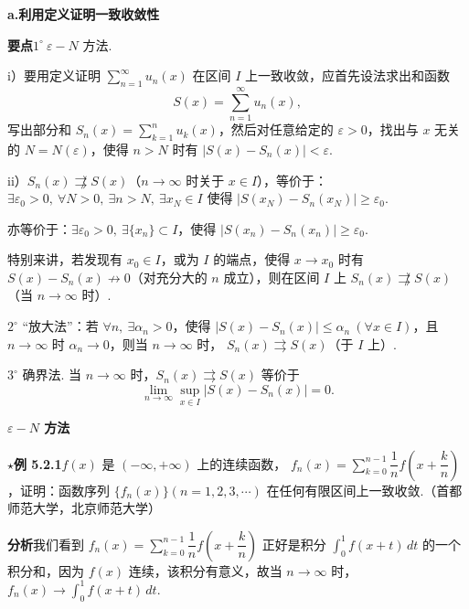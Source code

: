 \documentclass[UTF8, 12pt, fontset=fandol, oneside]{ctexart}
\begin{document}
\noindent\textbf{a.\quad 利用定义证明一致收敛性}

\noindent\textbf{要点}\quad $1^\circ\ \varepsilon-N$ 方法.

i）要用定义证明 $\displaystyle\sum_{n=1}^{\infty}u_n(x)$ 在区间 $I$ 上一致收敛，应首先设法求出和函数
\[
  S(x)=\sum_{n=1}^{\infty}u_n(x),
\]
写出部分和 $S_n(x)=\displaystyle\sum_{k=1}^n u_k(x)$，然后对任意给定的 $\varepsilon>0$，找出与 $x$ 无关的
$N=N(\varepsilon)$，使得 $n>N$ 时有 $|S(x)-S_n(x)|<\varepsilon$.

ii）$S_n(x)\not\rightrightarrows S(x)$（$n\to\infty$ 时关于 $x\in I$），等价于：
$\exists\varepsilon_0>0,\ \forall N>0,\ \exists n>N,\ \exists x_N\in I$ 使得
$|S(x_N)-S_n(x_N)|\ge\varepsilon_0$.

亦等价于：$\exists\varepsilon_0>0,\ \exists\{x_n\}\subset I$，使得
$|S(x_n)-S_n(x_n)|\ge\varepsilon_0$.

特别来讲，若发现有 $x_0\in I$，或为 $I$ 的端点，使得 $x\to x_0$ 时有
$S(x)-S_n(x)\not\to0$（对充分大的 $n$ 成立），则在区间 $I$ 上
$S_n(x)\not\rightrightarrows S(x)$（当 $n\to\infty$ 时）.

$2^\circ$ “放大法”：若 $\forall n,\ \exists\alpha_n>0$，使得
$|S(x)-S_n(x)|\le\alpha_n\ (\forall x\in I)$，且 $n\to\infty$ 时 $\alpha_n\to0$，则当 $n\to\infty$ 时，
$S_n(x)\rightrightarrows S(x)$（于 $I$ 上）.

$3^\circ$ 确界法. 当 $n\to\infty$ 时，$S_n(x)\rightrightarrows S(x)$ 等价于
\[
  \lim_{n\to\infty}\sup_{x\in I}|S(x)-S_n(x)|=0.
\]

\noindent\textbf{$\varepsilon-N$ 方法}

\noindent\textbf{$\star$例 5.2.1}\quad $f(x)$ 是 $(-\infty,+\infty)$ 上的连续函数，
$f_n(x)=\displaystyle\sum_{k=0}^{n-1}\dfrac1n f\left(x+\dfrac{k}{n}\right)$，证明：函数序列
$\{f_n(x)\}(n=1,2,3,\cdots)$ 在任何有限区间上一致收敛.（首都师范大学，北京师范大学）

\noindent\textbf{分析}\quad 我们看到
$f_n(x)=\displaystyle\sum_{k=0}^{n-1}\dfrac1n f\left(x+\dfrac{k}{n}\right)$ 正好是积分
$\displaystyle\int_0^1f(x+t)\,dt$ 的一个积分和，因为 $f(x)$ 连续，该积分有意义，故当
$n\to\infty$ 时，$f_n(x)\to\displaystyle\int_0^1f(x+t)\,dt$.
\end{document}
